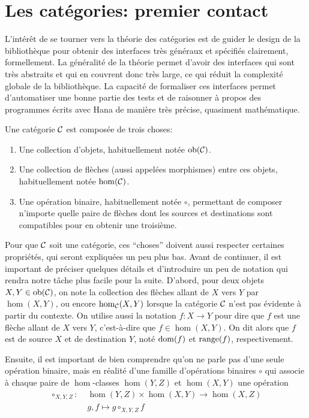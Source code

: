 \section{Les catégories: premier contact}
L'intérêt de se tourner vers la théorie des catégories est de guider le
design de la bibliothèque pour obtenir des interfaces très généraux et
spécifiés clairement, formellement. La généralité de la théorie permet
d'avoir des interfaces qui sont très abstraits et qui en couvrent donc
très large, ce qui réduit la complexité globale de la bibliothèque. La
capacité de formaliser ces interfaces permet d'automatiser une bonne partie
des tests et de raisonner à propos des programmes écrits avec Hana de manière
très précise, quasiment mathématique.

\begin{définition}[Catégorie]
    Une catégorie $\mathcal{C}$ est composée de trois choses:
    \begin{enumerate}
        \item Une collection d'objets, habituellement notée $\mathrm{ob}(\mathcal{C})$.
        \item Une collection de flèches (aussi appelées morphismes) entre ces
              objets, habituellement notée $\hom(\mathcal{C})$.
        \item Une opération binaire, habituellement notée $\circ$, permettant de
              composer n'importe quelle paire de flèches dont les sources et
              destinations sont compatibles pour en obtenir une troisième.
    \end{enumerate}
\end{définition}

Pour que $\mathcal{C}$ soit une catégorie, ces ``choses'' doivent aussi respecter
certaines propriétés, qui seront expliquées un peu plus bas. Avant de
continuer, il est important de préciser quelques détails et d'introduire
un peu de notation qui rendra notre tâche plus facile pour la suite. D'abord,
pour deux objets $X, Y \in \mathrm{ob}(\mathcal{C})$, on note la collection des flèches allant
de $X$ vers $Y$ par $\hom(X, Y)$, ou encore $\hom_{\mathcal{C}}(X, Y)$ lorsque la catégorie
$\mathcal{C}$ n'est pas évidente à partir du contexte. On utilise aussi la notation
$f : X \to Y$ pour dire que $f$ est une flèche allant de $X$ vers $Y$,
c'est-à-dire que $f \in \hom(X, Y)$. On dit alors que $f$ est de source
$X$ et de destination $Y$, noté $\mathrm{dom}(f)$ et $\mathrm{range}(f)$, respectivement.

Ensuite, il est important de bien comprendre qu'on ne parle pas d'une seule
opération binaire, mais en réalité d'une famille d'opérations binaires $\circ$
qui associe à chaque paire de $\hom$-classes $\hom(Y,Z)$ et $\hom(X,Y)$ une
opération
\begin{align*}
    \circ_{X,Y,Z} : \; &\hom(Y, Z) \times \hom(X, Y) \to \hom(X, Z) \\
                       &g, f \mapsto g \circ_{X,Y,Z} f
\end{align*}

